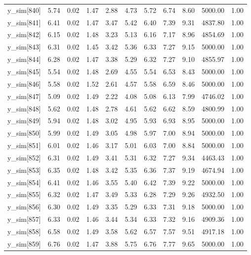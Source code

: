 \begin{table}[ht]
\begin{tabular}{rrrrrrrrrrr}
  y\_sim[840] & 5.74 & 0.02 & 1.47 & 2.88 & 4.73 & 5.72 & 6.74 & 8.60 & 5000.00 & 1.00 \\ 
  y\_sim[841] & 6.41 & 0.02 & 1.47 & 3.47 & 5.42 & 6.40 & 7.39 & 9.31 & 4837.80 & 1.00 \\ 
  y\_sim[842] & 6.15 & 0.02 & 1.48 & 3.23 & 5.13 & 6.16 & 7.17 & 8.96 & 4854.69 & 1.00 \\ 
  y\_sim[843] & 6.31 & 0.02 & 1.45 & 3.42 & 5.36 & 6.33 & 7.27 & 9.15 & 5000.00 & 1.00 \\ 
  y\_sim[844] & 6.28 & 0.02 & 1.47 & 3.38 & 5.29 & 6.32 & 7.27 & 9.10 & 4855.97 & 1.00 \\ 
  y\_sim[845] & 5.54 & 0.02 & 1.48 & 2.69 & 4.55 & 5.54 & 6.53 & 8.43 & 5000.00 & 1.00 \\ 
  y\_sim[846] & 5.58 & 0.02 & 1.52 & 2.61 & 4.57 & 5.58 & 6.59 & 8.46 & 5000.00 & 1.00 \\ 
  y\_sim[847] & 5.09 & 0.02 & 1.49 & 2.22 & 4.08 & 5.08 & 6.13 & 7.99 & 4746.02 & 1.00 \\ 
  y\_sim[848] & 5.62 & 0.02 & 1.48 & 2.78 & 4.61 & 5.62 & 6.62 & 8.59 & 4800.99 & 1.00 \\ 
  y\_sim[849] & 5.94 & 0.02 & 1.48 & 3.02 & 4.95 & 5.93 & 6.93 & 8.95 & 5000.00 & 1.00 \\ 
  y\_sim[850] & 5.99 & 0.02 & 1.49 & 3.05 & 4.98 & 5.97 & 7.00 & 8.94 & 5000.00 & 1.00 \\ 
  y\_sim[851] & 6.01 & 0.02 & 1.46 & 3.17 & 5.01 & 6.03 & 7.00 & 8.84 & 5000.00 & 1.00 \\ 
  y\_sim[852] & 6.31 & 0.02 & 1.49 & 3.41 & 5.31 & 6.32 & 7.27 & 9.34 & 4463.43 & 1.00 \\ 
  y\_sim[853] & 6.35 & 0.02 & 1.48 & 3.42 & 5.35 & 6.36 & 7.37 & 9.19 & 4674.94 & 1.00 \\ 
  y\_sim[854] & 6.41 & 0.02 & 1.46 & 3.55 & 5.40 & 6.42 & 7.39 & 9.22 & 5000.00 & 1.00 \\ 
  y\_sim[855] & 6.32 & 0.02 & 1.47 & 3.49 & 5.33 & 6.28 & 7.29 & 9.26 & 4932.50 & 1.00 \\ 
  y\_sim[856] & 6.30 & 0.02 & 1.49 & 3.35 & 5.29 & 6.33 & 7.31 & 9.18 & 5000.00 & 1.00 \\ 
  y\_sim[857] & 6.33 & 0.02 & 1.46 & 3.44 & 5.34 & 6.33 & 7.32 & 9.16 & 4909.36 & 1.00 \\ 
  y\_sim[858] & 6.58 & 0.02 & 1.49 & 3.58 & 5.62 & 6.57 & 7.57 & 9.51 & 4917.18 & 1.00 \\ 
  y\_sim[859] & 6.76 & 0.02 & 1.47 & 3.88 & 5.75 & 6.76 & 7.77 & 9.65 & 5000.00 & 1.00 \\ 

\end{tabular}
\end{table}

